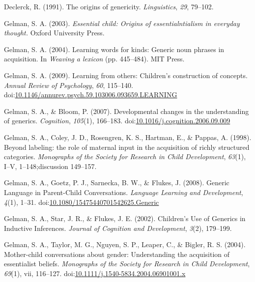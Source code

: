 \documentclass[floatsintext,doc]{apa6}
\theoremstyle{definition}
\theoremstyle{definition}
\theoremstyle{definition}
\theoremstyle{remark}
\begin{document}
\hypertarget{ref-Declerck1991}{}
Declerck, R. (1991). The origins of genericity. \emph{Linguistics},
\emph{29}, 79--102.

\hypertarget{ref-Gelman2003}{}
Gelman, S. A. (2003). \emph{Essential child: Origins of
essentialntialism in everyday thought.} Oxford University Press.

\hypertarget{ref-Gelman2004}{}
Gelman, S. A. (2004). Learning words for kinds: Generic noun phrases in
acquisition. In \emph{Weaving a lexicon} (pp. 445--484). MIT Press.

\hypertarget{ref-Gelman2009}{}
Gelman, S. A. (2009). Learning from others: Children's construction of
concepts. \emph{Annual Review of Psychology}, \emph{60}, 115--140.
doi:\href{https://doi.org/10.1146/annurev.psych.59.103006.093659.LEARNING}{10.1146/annurev.psych.59.103006.093659.LEARNING}

\hypertarget{ref-Gelman2007}{}
Gelman, S. A., \& Bloom, P. (2007). Developmental changes in the
understanding of generics. \emph{Cognition}, \emph{105}(1), 166--183.
doi:\href{https://doi.org/10.1016/j.cognition.2006.09.009}{10.1016/j.cognition.2006.09.009}

\hypertarget{ref-Gelman1998}{}
Gelman, S. A., Coley, J. D., Rosengren, K. S., Hartman, E., \& Pappas,
A. (1998). Beyond labeling: the role of maternal input in the
acquisition of richly structured categories. \emph{Monographs of the
Society for Research in Child Development}, \emph{63}(1), I--V,
1--148;discussion 149--157.

\hypertarget{ref-Gelman2008}{}
Gelman, S. A., Goetz, P. J., Sarnecka, B. W., \& Flukes, J. (2008).
Generic Language in Parent-Child Conversations. \emph{Language Learning
and Development}, \emph{4}(1), 1--31.
doi:\href{https://doi.org/10.1080/15475440701542625.Generic}{10.1080/15475440701542625.Generic}

\hypertarget{ref-Gelman2002}{}
Gelman, S. A., Star, J. R., \& Flukes, J. E. (2002). Children's Use of
Generics in Inductive Inferences. \emph{Journal of Cognition and
Development}, \emph{3}(2), 179--199.

\hypertarget{ref-GelmanEtAl2004}{}
Gelman, S. A., Taylor, M. G., Nguyen, S. P., Leaper, C., \& Bigler, R.
S. (2004). Mother-child conversations about gender: Understanding the
acquisition of essentialist beliefs. \emph{Monographs of the Society for
Research in Child Development}, \emph{69}(1), vii, 116--127.
doi:\href{https://doi.org/10.1111/j.1540-5834.2004.06901001.x}{10.1111/j.1540-5834.2004.06901001.x}
\end{document}
